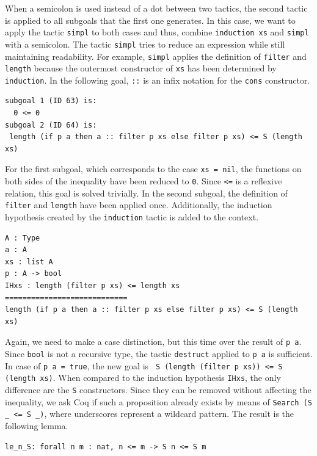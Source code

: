 \documentclass[a4paper, 11pt, fleqn, twoside]{scrreprt}
\newcommand{\cinl}[1]{\texttt{#1}}
\begin{document}
When a semicolon is used instead of a dot between two tactics, the second tactic is applied to all subgoals that the first one generates.
In this case, we want to apply the tactic \cinl{simpl} to both cases and thus, combine \cinl{induction xs} and \cinl{simpl} with a semicolon.
The tactic \cinl{simpl} tries to reduce an expression while still maintaining readability.
For example, \cinl{simpl} applies the definition of \cinl{filter} and \cinl{length} because the outermost constructor of \cinl{xs} has been determined by \cinl{induction}.
In the following goal, \cinl{::} is an infix notation for the \cinl{cons} constructor.

\begin{verbatim}
subgoal 1 (ID 63) is:
  0 <= 0
subgoal 2 (ID 64) is:
 length (if p a then a :: filter p xs else filter p xs) <= S (length xs)
\end{verbatim}

For the first subgoal, which corresponds to the case \cinl{xs = nil}, the functions on both sides of the inequality have been reduced to \cinl{0}.
Since \cinl{<=} is a reflexive relation, this goal is solved trivially.
In the second subgoal, the definition of \cinl{filter} and \cinl{length} have been applied once.
Additionally, the induction hypothesis created by the \cinl{induction} tactic is added to the context.

\begin{verbatim}
A : Type
a : A
xs : list A
p : A -> bool
IHxs : length (filter p xs) <= length xs
============================
length (if p a then a :: filter p xs else filter p xs) <= S (length xs)
\end{verbatim}

Again, we need to make a case distinction, but this time over the result of \cinl{p a}.
Since \cinl{bool} is not a recursive type, the tactic \cinl{destruct} applied to \cinl{p a} is sufficient.
In case of \cinl{p a = true}, the new goal is \cinl{ S (length (filter p xs)) <= S (length xs)}.
When compared to the induction hypothesis \cinl{IHxs}, the only difference are the \cinl{S} constructors.
Since they can be removed without affecting the inequality, we ask Coq if such a proposition already exists by means of \cinl{Search (S _ <= S _)}, where underscores represent a wildcard pattern.
The result is the following lemma.

\begin{verbatim}
le_n_S: forall n m : nat, n <= m -> S n <= S m
\end{verbatim}
\end{document}
